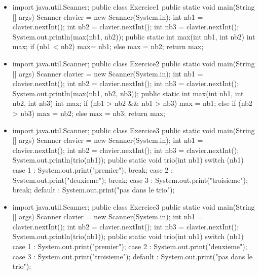 \documentclass[11pt,a4paper]{article}
\begin{document}
\begin{itemize}
			\item \begin{Java}
import java.util.Scanner;
public class Exercice1 {
    public static void main(String [] args) {
        Scanner clavier = new Scanner(System.in);
        int nb1 = clavier.nextInt();
        int nb2 = clavier.nextInt();
        int nb3 = clavier.nextInt();
        System.out.println(max(nb1, nb2));
    }
    public static int max(int nb1, int nb2) {
        int max;
        if (nb1 < nb2){
          max= nb1;
        } else {
          max = nb2;
        } 
        return max;
    }
}
        \end{Java} \textcolor{gray}{\underline{\hspace*{1em}}} 
			\item \begin{Java}
import java.util.Scanner;
public class Exercice2 {
    public static void main(String [] args) {
        Scanner clavier = new Scanner(System.in);
        int nb1 = clavier.nextInt();
        int nb2 = clavier.nextInt();
        int nb3 = clavier.nextInt();
        System.out.println(max(nb1, nb2, nb3));
    }
    public static int max(int nb1, int nb2, int nb3) {
        int max;
        if (nb1 > nb2 && nb1 > nb3){
          max = nb1;
        } else {
            if (nb2 > nb3){
              max = nb2;
            } else {
              max = nb3;
            }
        } 
        return max;
    }
}
        \end{Java} \textcolor{gray}{\underline{\hspace*{1em}}} 
			\item \begin{Java}
import java.util.Scanner;
public class Exercice3 {
    public static void main(String [] args) {
        Scanner clavier = new Scanner(System.in);
        int nb1 = clavier.nextInt();
        int nb2 = clavier.nextInt();
        int nb3 = clavier.nextInt();
        System.out.println(trio(nb1));
    }
    public static void trio(int nb1) {
        switch (nb1){
          case 1 : System.out.print("premier"); break;
          case 2 : System.out.print("deuxieme"); break;
          case 3 : System.out.print("troisieme"); break;
          default : System.out.print("pas dans le trio");
        } 
    }
}
        \end{Java} \textcolor{gray}{\underline{\hspace*{10em}}} 
			\item \begin{Java}
import java.util.Scanner;
public class Exercice3 {
    public static void main(String [] args) {
        Scanner clavier = new Scanner(System.in);
        int nb1 = clavier.nextInt();
        int nb2 = clavier.nextInt();
        int nb3 = clavier.nextInt();
        System.out.println(trio(nb1));
    }
    public static void trio(int nb1) {
        switch (nb1){
          case 1 : System.out.print("premier");
          case 2 : System.out.print("deuxieme");
          case 3 : System.out.print("troisieme");
          default : System.out.print("pas dans le trio");
        } 
    }
}
        \end{Java} \textcolor{gray}{\underline{\hspace*{20em}}} 
					\end{itemize}
\end{document}
